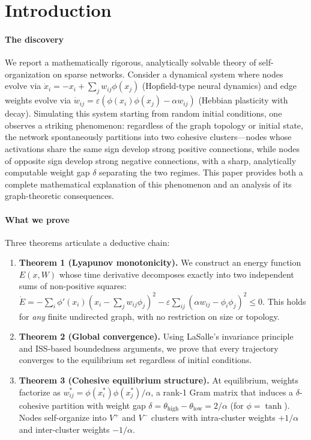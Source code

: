 \documentclass[3p]{elsarticle}
\begin{document}
\section{Introduction}

\paragraph{The discovery}
We report a mathematically rigorous, analytically solvable theory of self-organization on sparse networks. Consider a dynamical system where nodes evolve via $\dot x_i = -x_i + \sum_j w_{ij}\phi(x_j)$ (Hopfield-type neural dynamics) and edge weights evolve via $\dot w_{ij} = \varepsilon(\phi(x_i)\phi(x_j) - \alpha w_{ij})$ (Hebbian plasticity with decay). Simulating this system starting from random initial conditions, one observes a striking phenomenon: regardless of the graph topology or initial state, the network spontaneously partitions into two cohesive clusters---nodes whose activations share the same sign develop strong positive connections, while nodes of opposite sign develop strong negative connections, with a sharp, analytically computable weight gap $\delta$ separating the two regimes. This paper provides both a complete mathematical explanation of this phenomenon and an analysis of its graph-theoretic consequences.

\paragraph{What we prove}
Three theorems articulate a deductive chain:
\begin{enumerate}[nosep]
  \item \textbf{Theorem 1 (Lyapunov monotonicity).} We construct an energy function $E(x,W)$ whose time derivative decomposes exactly into two independent sums of non-positive squares: $\dot E = -\sum_i \phi'(x_i)(x_i - \sum_j w_{ij}\phi_j)^2 - \varepsilon\sum_{ij}(\alpha w_{ij} - \phi_i\phi_j)^2 \le 0$. This holds for \emph{any} finite undirected graph, with no restriction on size or topology.
  \item \textbf{Theorem 2 (Global convergence).} Using LaSalle's invariance principle and ISS-based boundedness arguments, we prove that every trajectory converges to the equilibrium set regardless of initial conditions.
  \item \textbf{Theorem 3 (Cohesive equilibrium structure).} At equilibrium, weights factorize as $w_{ij}^* = \phi(x_i^*)\phi(x_j^*)/\alpha$, a rank-1 Gram matrix that induces a $\delta$-cohesive partition with weight gap $\delta = \theta_{\text{high}} - \theta_{\text{low}} = 2/\alpha$ (for $\phi=\tanh$). Nodes self-organize into $V^+$ and $V^-$ clusters with intra-cluster weights $+1/\alpha$ and inter-cluster weights $-1/\alpha$.
\end{enumerate}
\end{document}
